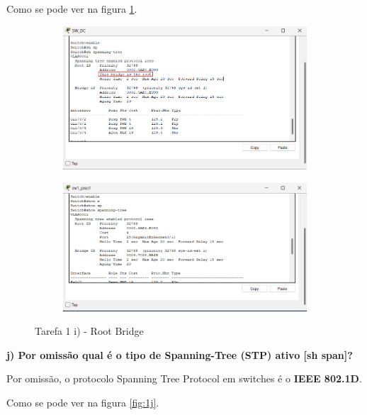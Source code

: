 \documentclass[11pt,english, openright, oneside]{book}
\begin{document}
Como se pode ver na figura \ref{fig:1i}.
\vspace{0.4cm}
\begin{figure}[h]
    \centering
    \begin{subfigure}{.47\textwidth}
        \centering
        \includegraphics[width=0.99\linewidth]{imagens/Tarefa1/1.i.png}
    \end{subfigure}%
    \begin{subfigure}{.53\textwidth}
        \centering
        \includegraphics[width=0.99\linewidth]{imagens/Tarefa1/1.i.2.png}
    \end{subfigure}
    \caption{Tarefa 1 i) - Root Bridge}
    \label{fig:1i}
\end{figure}

\newpage

\textbf{j) Por omissão qual é o tipo de Spanning-Tree (STP) ativo [sh span]?}
\vspace{0.2cm}

Por omissão, o protocolo Spanning Tree Protocol em switches é o \textbf{IEEE
802.1D}.

Como se pode ver na figura \ref{fig:1j}.
\vspace{0.4cm}
\end{document}
